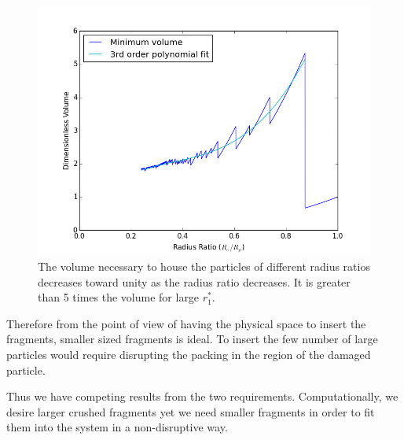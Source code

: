 \begin{figure}[!t]
\centering
    \includegraphics[width=\singleimagewidth]{chapters/figures/crush-fragments/fragment-volume-ratio.png}
    \caption{The volume necessary to house the particles of different radius ratios decreases toward unity as the radius ratio decreases. It is greater than 5 times the volume for large $r_1^*$.}
    \label{fig:volume-ratio}
\end{figure}

Therefore from the point of view of having the physical space to insert the fragments, smaller sized fragments is ideal. To insert the few number of large particles would require disrupting the packing in the region of the damaged particle.

Thus we have competing results from the two requirements. Computationally, we desire larger crushed fragments yet we need smaller fragments in order to fit them into the system in a non-disruptive way.


